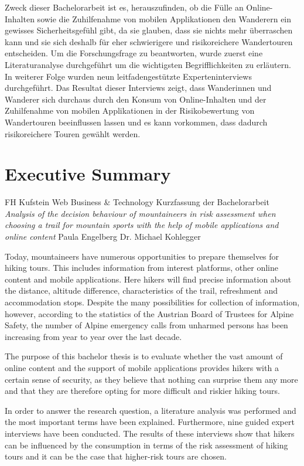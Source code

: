 Zweck dieser Bachelorarbeit ist es, herauszufinden, ob die Fülle an Online-Inhalten sowie die Zuhilfenahme von mobilen Applikationen den Wanderern ein gewisses Sicherheitsgefühl gibt, da sie glauben, dass sie nichts mehr überraschen kann und sie sich deshalb für eher schwierigere und risikoreichere Wandertouren entscheiden. Um die Forschungsfrage zu beantworten, wurde zuerst eine Literaturanalyse durchgeführt um die wichtigsten Begrifflichkeiten zu erläutern. In weiterer Folge wurden neun leitfadengestützte Experteninterviews durchgeführt. Das Resultat dieser Interviews zeigt, dass Wanderinnen und Wanderer sich durchaus durch den Konsum von Online-Inhalten und der Zuhilfenahme von mobilen Applikationen in der Risikobewertung von Wandertouren beeinflussen lassen und es kann vorkommen, dass dadurch risikoreichere Touren gewählt werden.




\chapter*{Executive Summary}

FH Kufstein\newline
Web Business \& Technology\newline
Kurzfassung der Bachelorarbeit \textit{Analysis of the decision behaviour of mountaineers in risk assessment when choosing a trail for mountain sports with the help of mobile applications and online content}\newline
Paula Engelberg\newline
Dr. Michael Kohlegger

Today, mountaineers have numerous opportunities to prepare themselves for hiking tours. This includes information from interest platforms, other online content and mobile applications. Here hikers will find precise information about the distance, altitude difference, characteristics of the trail, refreshment and accommodation stops. Despite the many possibilities for collection of information, however, according to the statistics of the Austrian Board of Trustees for Alpine Safety, the number of Alpine emergency calls from unharmed persons has been increasing from year to year over the last decade.

The purpose of this bachelor thesis is to evaluate whether the vast amount of online content and the support of mobile applications provides hikers with a certain sense of security, as they believe that nothing can surprise them any more and that they are therefore opting for more difficult and riskier hiking tours. 

In order to answer the research question, a literature analysis was performed and the most important terms have been explained. Furthermore, nine guided expert interviews have been conducted. 
The results of these interviews show that hikers can be influenced by the consumption in terms of the risk assessment of hiking tours and it can be the case that higher-risk tours are chosen.



